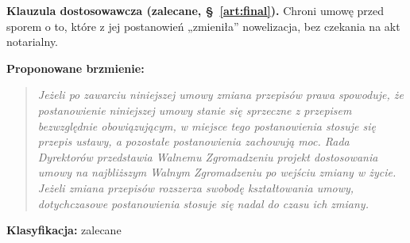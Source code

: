 \documentclass[12pt,a4paper]{report}
\newcommand{\Klasa}[1]{\textbf{Klasyfikacja:} #1\par}
\newenvironment{Brzmienie}{\par\textbf{Proponowane brzmienie:}\begin{quote}\itshape}{\end{quote}}
\begin{document}
\textbf{Klauzula dostosowawcza (zalecane, §~\ref{art:final}).} Chroni umowę przed sporem o to, które z jej postanowień „zmieniła” nowelizacja, bez czekania na akt notarialny.
\begin{Brzmienie}
Jeżeli po zawarciu niniejszej umowy zmiana przepisów prawa spowoduje, że postanowienie niniejszej umowy stanie się sprzeczne z przepisem bezwzględnie obowiązującym, w miejsce tego postanowienia stosuje się przepis ustawy, a pozostałe postanowienia zachowują moc. Rada Dyrektorów przedstawia Walnemu Zgromadzeniu projekt dostosowania umowy na najbliższym Walnym Zgromadzeniu po wejściu zmiany w życie. Jeżeli zmiana przepisów rozszerza swobodę kształtowania umowy, dotychczasowe postanowienia stosuje się nadal do czasu ich zmiany.
\end{Brzmienie}
\Klasa{zalecane}
\end{document}
